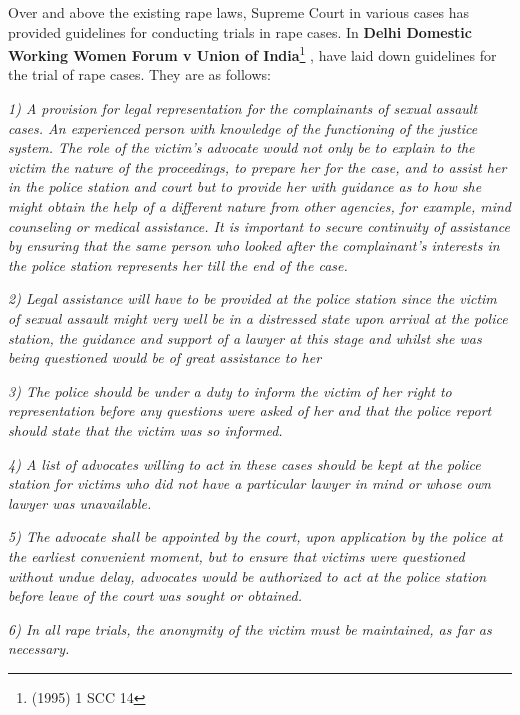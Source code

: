 \begin{multicols}{2}

\vspace{-.1cm}

\noi
Over and above the existing rape laws, Supreme Court in various cases has provided
guidelines for conducting trials in rape cases. In \textbf{Delhi Domestic Working Women
Forum v Union of India}\footnote{ (1995) 1 SCC 14}
, have laid down guidelines for the trial of rape cases. They
are as follows: 

\noi
\textit{1) A provision for legal representation for the complainants of sexual assault
cases. An experienced person with knowledge of the functioning of the justice system.
The role of the victim's advocate would not only be to explain to the victim the nature
of the proceedings, to prepare her for the case, and to assist her in the police station
and court but to provide her with guidance as to how she might obtain the help of a
different nature from other agencies, for example, mind counseling or medical
assistance. It is important to secure continuity of assistance by ensuring that the same
person who looked after the complainant's interests in the police station represents her
till the end of the case.}

\noi
\textit{2) Legal assistance will have to be provided at the police station since the victim
of sexual assault might very well be in a distressed state upon arrival at the police
station, the guidance and support of a lawyer at this stage and whilst she was being
questioned would be of great assistance to her}

\noi
\textit{3) The police should be under a duty to inform the victim of her right to
representation before any questions were asked of her and that the police report should
state that the victim was so informed.}

\noi
\textit{4) A list of advocates willing to act in these cases should be kept at the police
station for victims who did not have a particular lawyer in mind or whose own lawyer
was unavailable.}

\noi
\textit{5) The advocate shall be appointed by the court, upon application by the police at
the earliest convenient moment, but to ensure that victims were questioned without
undue delay, advocates would be authorized to act at the police station before leave of
the court was sought or obtained.}

\noi
\textit{6) In all rape trials, the anonymity of the victim must be maintained, as far as
necessary.}


\end{multicols}
